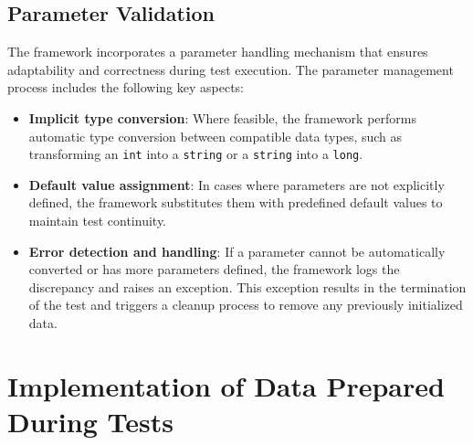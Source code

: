 \subsection{Parameter Validation}

The framework incorporates a parameter handling mechanism that ensures adaptability and correctness during test execution. The parameter management process includes the following key aspects:  

\begin{itemize}  
    \item \textbf{Implicit type conversion}: Where feasible, the framework performs automatic type conversion between compatible data types, such as transforming an \texttt{int} into a \texttt{string} or a \texttt{string} into a \texttt{long}.  
    \item \textbf{Default value assignment}: In cases where parameters are not explicitly defined, the framework substitutes them with predefined default values to maintain test continuity.  
    \item \textbf{Error detection and handling}: If a parameter cannot be automatically converted or has more parameters defined, the framework logs the discrepancy and raises an exception. This exception results in the termination of the test and triggers a cleanup process to remove any previously initialized data.  
\end{itemize}  


\section{Implementation of Data Prepared During Tests}

